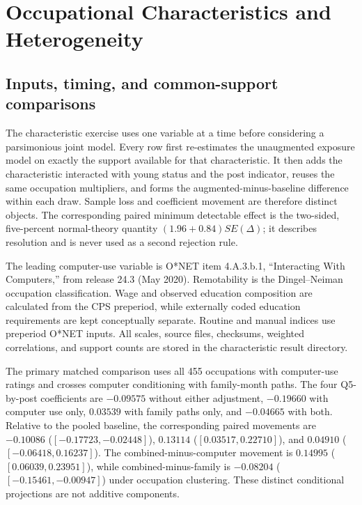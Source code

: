 \section{Occupational Characteristics and Heterogeneity}\label{app:characteristics}

\subsection{Inputs, timing, and common-support comparisons}

The characteristic exercise uses one variable at a time before considering a parsimonious joint model.  Every row first re-estimates the unaugmented exposure model on exactly the support available for that characteristic.  It then adds the characteristic interacted with young status and the post indicator, reuses the same occupation multipliers, and forms the augmented-minus-baseline difference within each draw.  Sample loss and coefficient movement are therefore distinct objects.  The corresponding paired minimum detectable effect is the two-sided, five-percent normal-theory quantity $(1.96+0.84)SE(\Delta)$; it describes resolution and is never used as a second rejection rule.

The leading computer-use variable is O*NET item 4.A.3.b.1, ``Interacting With Computers,'' from release 24.3 (May 2020).  Remotability is the Dingel--Neiman occupation classification.  Wage and observed education composition are calculated from the CPS preperiod, while externally coded education requirements are kept conceptually separate.  Routine and manual indices use preperiod O*NET inputs.  All scales, source files, checksums, weighted correlations, and support counts are stored in the characteristic result directory.

The primary matched comparison uses all 455 occupations with computer-use
ratings and crosses computer conditioning with family-month paths.  The four
Q5-by-post coefficients are $-0.09575$ without either adjustment, $-0.19660$
with computer use only, $0.03539$ with family paths only, and $-0.04665$ with
both.  Relative to the pooled baseline, the corresponding paired movements
are $-0.10086$ ($[-0.17723,-0.02448]$), $0.13114$
($[0.03517,0.22710]$), and $0.04910$ ($[-0.06418,0.16237]$).
The combined-minus-computer movement is $0.14995$
($[0.06039,0.23951]$), while combined-minus-family is $-0.08204$
($[-0.15461,-0.00947]$) under occupation clustering.  These distinct
conditional projections are not additive components.

